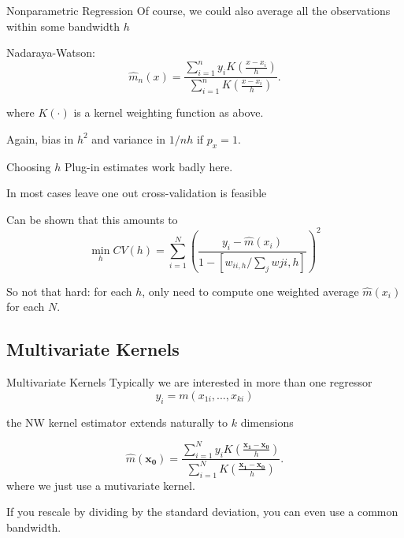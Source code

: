 \begin{frame}{Nonparametric Regression}
Of course, we could also average all the observations within some bandwidth $h$  


Nadaraya-Watson:
\[
{\hat m}_n(x)=\frac{\sum_{i=1}^n y_i
K\left(\frac{x-x_i}{h}\right)}{\sum_{i=1}^n
K\left(\frac{x-x_i}{h}\right)}.
\]

where $K(\cdot)$ is a kernel weighting function as above. 

Again, bias in $h^2$ and variance in $1/nh$ if $p_x=1$.

\end{frame}


\begin{frame}{Choosing $h$}
Plug-in estimates work badly here. 

In most cases leave one out cross-validation is feasible

Can be shown that this amounts to 
$$ \min_h CV(h) = \sum_{i=1}^N \left(\frac{y_i - \hat m (x_i)}{1 - \left[w_{ii,h}/\sum_j w{ji,h}\right]} \right)^2 $$

So not that hard: for each $h$, only need to compute one weighted average $\hat m(x_i)$ for each $N$.
\end{frame}

\subsection{Multivariate Kernels}
\begin{frame}{Multivariate Kernels}
  Typically we are interested in more than one regressor 
  $$ y_i = m(x_{1i},...,x_{ki}) $$

  the NW kernel estimator extends naturally to $k$ dimensions

  \[
{\hat m}(\mathbf{x_0})=\frac{\sum_{i=1}^N y_i
K\left(\frac{\mathbf{x_1}-\mathbf{x_0}}{h}\right)}{\sum_{i=1}^N
K\left(\frac{\mathbf{x_1}-\mathbf{x_0}}{h}\right)}.
\]
 where we just use a mutivariate kernel. 

 If you rescale by dividing by the standard deviation, you can even use a common bandwidth. 

\end{frame}

